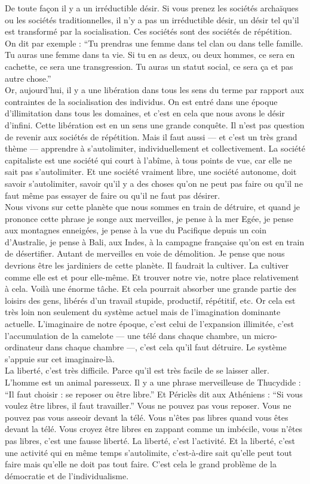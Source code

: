De toute façon il y a un irréductible désir. Si vous prenez les sociétés archaïques ou les sociétés traditionnelles, il n’y a pas un irréductible désir, un désir tel qu’il est transformé par la socialisation. Ces sociétés sont des sociétés de répétition. On dit par exemple : ``Tu prendras une femme dans tel clan ou dans telle famille. Tu auras une femme dans ta vie. Si tu en as deux, ou deux hommes, ce sera en cachette, ce sera une transgression. Tu auras un statut social, ce sera ça et pas autre chose.''\\
Or, aujourd’hui, il y a une libération dans tous les sens du terme par rapport aux contraintes de la socialisation des individus. On est entré dans une époque d’illimitation dans tous les domaines, et c’est en cela que nous avons le désir d’infini. Cette libération est en un sens une grande conquête. Il n’est pas question de revenir aux sociétés de répétition. Mais il faut aussi --- et c’est un très grand thème --- apprendre à s’autolimiter, individuellement et collectivement. La société capitaliste est une société qui court à l’abîme, à tous points de vue, car elle ne sait pas s’autolimiter. Et une société vraiment libre, une société autonome, doit savoir s’autolimiter, savoir qu’il y a des choses qu’on ne peut pas faire ou qu’il ne faut même pas essayer de faire ou qu’il ne faut pas désirer.\\
Nous vivons sur cette planète que nous sommes en train de détruire, et quand je prononce cette phrase je songe aux merveilles, je pense à la mer Egée, je pense aux montagnes enneigées, je pense à la vue du Pacifique depuis un coin d’Australie, je pense à Bali, aux Indes, à la campagne française qu’on est en train de désertifier. Autant de merveilles en voie de démolition. Je pense que nous devrions être les jardiniers de cette planète. Il faudrait la cultiver. La cultiver comme elle est et pour elle-même. Et trouver notre vie, notre place relativement à cela. Voilà une énorme tâche. Et cela pourrait absorber une grande partie des loisirs des gens, libérés d’un travail stupide, productif, répétitif, etc. Or cela est très loin non seulement du système actuel mais de l’imagination dominante actuelle. L’imaginaire de notre époque, c’est celui de l’expansion illimitée, c’est l’accumulation de la camelote --- une télé dans chaque chambre, un micro-ordinateur dans chaque chambre ---, c’est cela qu’il faut détruire. Le système s’appuie sur cet imaginaire-là.\\
La liberté, c’est très difficile. Parce qu’il est très facile de se laisser aller. L’homme est un animal paresseux. Il y a une phrase merveilleuse de Thucydide : ``Il faut choisir : se reposer ou être libre.'' Et Périclès dit aux Athéniens : ``Si vous voulez être libres, il faut travailler.'' Vous ne pouvez pas vous reposer. Vous ne pouvez pas vous asseoir devant la télé. Vous n’êtes pas libres quand vous êtes devant la télé. Vous croyez être libres en zappant comme un imbécile, vous n’êtes pas libres, c’est une fausse liberté. La liberté, c’est l’activité. Et la liberté, c’est une activité qui en même temps s’autolimite, c’est-à-dire sait qu’elle peut tout faire mais qu’elle ne doit pas tout faire. C’est cela le grand problème de la démocratie et de l’individualisme.


